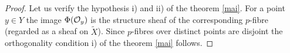 \documentclass[12pt]{article}
\def\db#1{ D^b_{coh}({#1})}
\def\h#1,#2{{\rm Hom}({#1}\:,\; {#2})}
\def\lto{\longrightarrow}
\def\o#1{{\cal O}_{#1}}
\begin{document}
\begin{proof}
%
%
%
%
%

Let us verify the hypothesis i) and ii) of the theorem \ref{mai}. For a point $y\in Y$ the image $\Phi ({\cal O}_y)$  is the structure sheaf of the corresponding $p$-fibre (regarded as a sheaf on ${\widetilde X}$). Since $p$-fibres over distinct points are disjoint the orthogonality condition    i) of the theorem \ref{mai} follows.


\end{proof}
\end{document}
